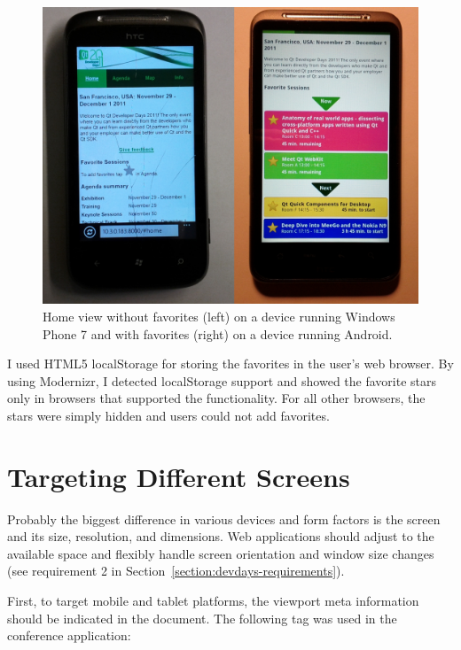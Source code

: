 \begin{figure}[h!]
  \begin{center}
    \includegraphics[width=\textwidth]{images/android-home.jpg}
    \caption{Home view without favorites (left) on a device running
      Windows Phone 7 and with favorites (right) on a device running
      Android.}
    \label{figure:android-home-favorites.jpg}
  \end{center}
\end{figure}

I used HTML5 localStorage for storing the favorites in the user's web
browser. By using Modernizr, I detected localStorage support and
showed the favorite stars only in browsers that supported the
functionality. For all other browsers, the stars were simply hidden
and users could not add favorites.

\section{Targeting Different Screens}
\label{section:targeting-screens}

Probably the biggest difference in various devices and form factors is
the screen and its size, resolution, and dimensions. Web applications
should adjust to the available space and flexibly handle screen
orientation and window size changes (see requirement 2 in
Section~\ref{section:devdays-requirements}).

First, to target mobile and tablet platforms, the viewport meta
information should be indicated in the document. The following tag was
used in the conference application:

